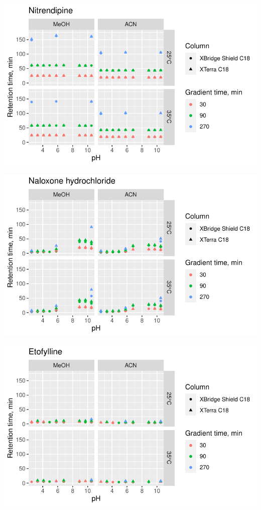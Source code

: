 \documentclass[
  letterpaper,
  DIV=11,
  numbers=noendperiod]{scrreprt}
\begin{document}
\includegraphics{index_files/figure-pdf/unnamed-chunk-4-120.pdf}

\includegraphics{index_files/figure-pdf/unnamed-chunk-4-121.pdf}

\includegraphics{index_files/figure-pdf/unnamed-chunk-4-122.pdf}
\end{document}
